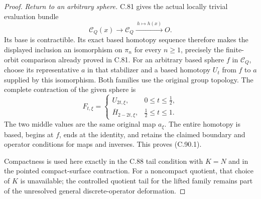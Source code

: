 \begin{proof}
\emph{Return to an arbitrary sphere.}
C.81 gives the actual locally trivial
evaluation bundle
\[
 \mathscr C_Q(x)\longrightarrow\mathscr C_Q
       \xrightarrow{\ h\mapsto h(x)\ }O.
                                                               \tag{C.90.8}
\]
Its base is contractible. Its exact
based homotopy sequence therefore
makes the displayed inclusion an
isomorphism on $\pi_n$ for every
$n\geq1$, precisely the finite-orbit
comparison already proved in C.81.
For an arbitrary based sphere $f$
in $\mathscr C_Q$, choose its
representative $a$ in that stabilizer
and a based homotopy $U_t$ from $f$
to $a$ supplied by this isomorphism.
Both families use the original group
topology. The complete contraction of
the given sphere is
\[
 F_{t,\xi}=
 \begin{cases}
 U_{2t,\xi},&0\leq t\leq\tfrac12,\\
 \overline H_{2-2t,\xi},&\tfrac12\leq t\leq1.
 \end{cases}
                                                               \tag{C.90.9}
\]
The two middle values are the same
original map $a_\xi$. The entire
homotopy is based, begins at $f$,
ends at the identity, and retains
the claimed boundary and operator
conditions for maps and inverses.
This proves (C.90.1).

Compactness is used here exactly in
the C.88 tail condition with $K=N$
and in the pointed compact-surface
contraction. For a noncompact
quotient, that choice of $K$ is
unavailable; the controlled quotient
tail for the lifted family remains
part of the unresolved general
discrete-operator deformation.
\end{proof}
